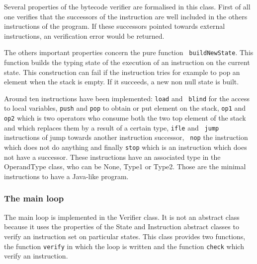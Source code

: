 Several properties of the bytecode verifier are formalised in this class.
First of all one verifies that the successors of the instruction are well included in the others instructions of the program. 
If these successors pointed towards external instructions, an verification error would be returned. 

The others important properties concern the pure function {\tt
buildNewState}.  This function builds the typing state of the
execution of an instruction on the current state.  This construction
can fail if the instruction tries for example to pop an element when
the stack is empty.  If it succeeds, a new non null state is built.


Around ten instructions have been implemented: {\tt load} and {\tt
blind} for the access to local variables, {\tt push} and {\tt pop} to
obtain or put element on the stack, {\tt op1} and {\tt op2} which is
two operators who consume both the two top element of the stack and
which replaces them by a result of a certain type, {\tt ifle} and {\tt
jump} instructions of jump towards another instruction successor, {\tt
nop} the instruction which does not do anything and finally {\tt stop}
which is an instruction which does not have a successor.  These
instructions have an associated type in the OperandType class, who can
be None, Type1 or Type2.  Those are the minimal instructions to have a
Java-like program.

\subsubsection {The main loop}
The main loop is implemented in the Verifier class.  It is not an
abstract class because it uses the properties of the State and
Instruction abstract classes to verify an instruction set on
particular states.  This class provides two functions, the function
{\tt verify} in which the loop is written and the function {\tt check}
which verify an instruction.


